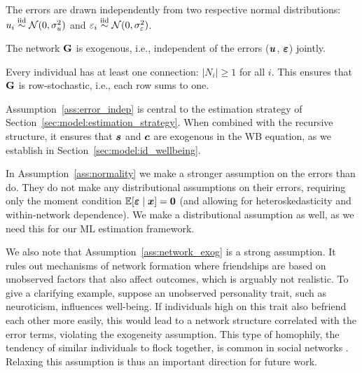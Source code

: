\begin{assumption}
\label{ass:normality}
The errors are drawn independently from two respective normal distributions: $u_i \stackrel{\text{iid}}{\sim} \mathcal{N}(0, \sigma_u^2)$ and $\varepsilon_i \stackrel{\text{iid}}{\sim} \mathcal{N}(0, \sigma_\varepsilon^2)$.
\end{assumption}

\begin{assumption}
\label{ass:network_exog}
The network $\mathbf{G}$ is exogenous, i.e., independent of the errors ($\bm{u}$, $\bm{\varepsilon}$) jointly.
\end{assumption}

\begin{assumption}
\label{ass:no_isolates}
Every individual has at least one connection: $|N_i| \geq 1$ for all $i$. This ensures that $\mathbf{G}$ is row-stochastic, i.e., each row sums to one.
\end{assumption}

Assumption~\ref{ass:error_indep} is central to the estimation strategy of Section~\ref{sec:model:estimation_strategy}. When combined with the recursive structure, it ensures that $\bm{s}$ and $\bm{c}$ are exogenous in the WB equation, as we establish in Section~\ref{sec:model:id_wellbeing}.

In Assumption~\ref{ass:normality} we make a stronger assumption on the errors than \textcite[Sec.~2.1]{Bramoulle2009} do. They do not make any distributional assumptions on their errors, requiring only the moment condition $\mathbb{E}[\bm{\varepsilon} \mid \bm{x}] = \bm{0}$ (and allowing for heteroskedasticity and within-network dependence). We make a distributional assumption as well, as we need this for our ML estimation framework.

We also note that Assumption~\ref{ass:network_exog} is a strong assumption. It rules out mechanisms of network formation where friendships are based on unobserved factors that also affect outcomes, which is arguably not realistic. To give a clarifying example, suppose an unobserved personality trait, such as neuroticism, influences well-being. If individuals high on this trait also befriend each other more easily, this would lead to a network structure correlated with the error terms, violating the exogeneity assumption. This type of homophily, the tendency of similar individuals to flock together, is common in social networks \parencite{McPherson2001}. Relaxing this assumption is thus an important direction for future work.

